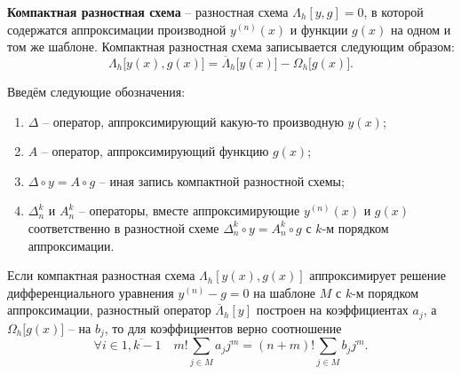 \documentclass[../main.tex]{subfile}
\begin{document}
\begin{define}
	\textbf{Компактная разностная схема} -- разностная схема
	$\Lambda_h[y,g]=0$, в которой содержатся аппроксимации производной
	$y^{(n)}(x)$ и функции $g(x)$ на одном и том же шаблоне. Компактная
	разностная схема записывается следующим образом:
	\[\Lambda_h\big[y(x),g(x)\big]=\overline{\Lambda}_h\big[y(x)\big]-
	\Omega_h\big[g(x)].\]
\end{define}

\begin{define}
	Введём следующие обозначения:
	\begin{enumerate}[nosep]
		\item $\Delta$ -- оператор, аппроксимирующий какую-то
			производную $y(x)$;
		\item $A$ -- оператор, аппроксимирующий функцию $g(x)$;
		\item $\Delta\circ y=A\circ g$ -- иная запись компактной
			разностной схемы;
		\item $\Delta_n^k$ и $A_n^k$ -- операторы, вместе
			аппроксимирующие $y^{(n)}(x)$ и $g(x)$ соответственно в
			разностной схеме $\Delta_n^k\circ y=A_n^k\circ g$
			с $k$-м порядком аппроксимации.
	\end{enumerate}
\end{define}

\begin{theorem}
\label{eq:compact_difference_scheme_theorem}
	Если компактная разностная схема $\Lambda_h[y(x),g(x)]$ аппроксимирует
	решение дифференциального уравнения $y^{(n)}-g=0$ на шаблоне $M$ с $k$-м
	порядком аппроксимации, разностный оператор $\overline{\Lambda}_h[y]$
	построен на коэффициентах $a_j$, а $\Omega_h\big[g(x)]$ -- на $b_j$, то
	для коэффициентов верно соотношение
	\[\boxed{\forall i\in\overline{1,k-1}\quad m!\sum_{j\in M}a_jj^m=(n+m)!
	\sum_{j\in M}b_jj^m}.\]
\end{theorem}
\end{document}

